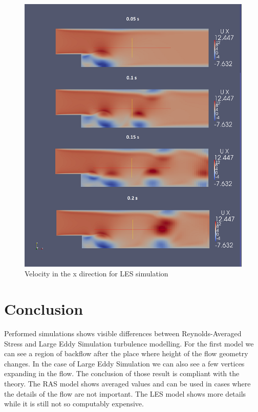 \documentclass[a4paper]{article}
\begin{document}
\begin{figure}[h!]
\centering
\includegraphics[scale=0.6]{LES_Model}
\caption{Velocity in the x direction for LES simulation}
\label{fig:LES_Model}
\end{figure}

\section{Conclusion}
Performed simulations shows visible differences between Reynolds-Averaged Stress and Large Eddy Simulation turbulence modelling. For the first model we can
see a region of backflow after the place where height of the flow geometry changes. In the case of Large Eddy Simulation we can also see a few vertices expanding in the flow. The conclusion of those result is compliant with the theory. The RAS model shows averaged values and can be used in cases where the details of the flow are not important. The LES model shows more details while it is still not so computably expensive.
\end{document}
